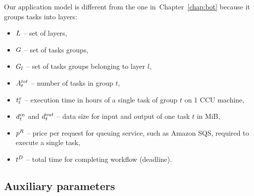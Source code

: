 {  
    Our application model is different from the one in~Chapter~\ref{chap:bot} because it groups tasks into layers:

    \begin{itemize}
        \item $L$  -- set of layers,
        \item $G$   -- set of tasks groups,
        \item $G_l$ -- set of tasks groups belonging to layer $l$, 
        \item $A^{tot}_t$ -- number of tasks in group $t$,
        \item $t^x_t$ -- execution time in hours of a single task of group $t$ on 1 CCU
        machine,
        \item $d^{in}_t$ and $d^{out}_t$ -- data size for input and
        output of one task $t$ in MiB,
        \item $p^{R}$ -- price per request for queuing service, such as Amazon SQS, required to execute a single task,
        \item $t^D$ -- total time for completing workflow (deadline).
    \end{itemize} 
    
    \subsection{Auxiliary parameters}
    \label{sec:workflow:problem:auxiliary}
    
}
